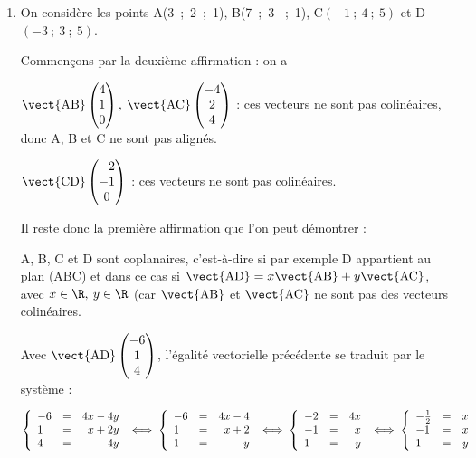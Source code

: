 \begin{enumerate}
\begin{enumerate}
	\end{enumerate}
\item On considère les points A(3~;~2~;~1), B(7~;~3 ~;~1), C$(-1~;~4~;~5)$ et D$(- 3~;~3~;~5)$.

Commençons par la deuxième affirmation : on a 

$\vect{\text{AB}}\begin{pmatrix}4\\1\\0\end{pmatrix}, \: \vect{\text{AC}}\begin{pmatrix}-4\\2\\4\end{pmatrix}$ : ces vecteurs ne sont pas colinéaires, donc A, B et C ne sont pas alignés.

$\vect{\text{CD}}\begin{pmatrix}-2\\-1\\0\end{pmatrix}$ : ces vecteurs ne sont pas colinéaires.

Il reste donc la première affirmation que l'on peut démontrer :

A, B, C et D sont coplanaires, c'est-à-dire si par exemple D appartient au plan (ABC) et dans ce cas si $\vect{\text{AD}} = x\vect{\text{AB}} + y\vect{\text{AC}}$, avec $x \in \R,\: y \in \R$ (car $\vect{\text{AB}}$ et $\vect{\text{AC}}$ ne sont pas des vecteurs colinéaires.

Avec $\vect{\text{AD}}\begin{pmatrix}-6\\1\\4\end{pmatrix}$, l'égalité vectorielle précédente se traduit par le système :

$\left\{\begin{array}{l c r}
-6&=&4x - 4y\\
1&=&x + 2y\\
4 &=& 4y
\end{array}\right. \iff \left\{\begin{array}{l c r}
-6&=&4x - 4\\
1&=&x + 2\\
1 &=& y
\end{array}\right. \iff
\left\{\begin{array}{l c r}
-2&=&4x\\
-1&=&x\\
1 &=& y
\end{array}\right. \iff \left\{\begin{array}{l c r}
-\frac12&=&x\\
-1&=&x\\
1 &=& y
\end{array}\right.$


\end{enumerate}
